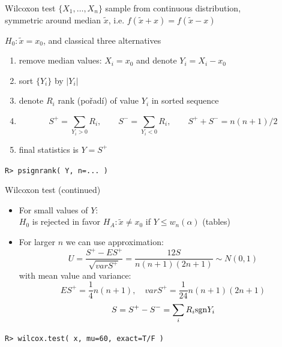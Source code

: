 \documentclass[smaller]{beamer}
\def\sgn{{\rm sgn}}
\def\abs#1{\lvert#1\rvert}
\def\blue#1{{\usebeamercolor[fg]{my blue} #1}}
\def\xskip{{\vspace{2ex}}}
\def\cz#1{{\small (#1)}}
\begin{document}
\begin{frame}[fragile]{Wilcoxon test}
$\{X_1,\dots,X_n\}$ sample from continuous distribution,\\
\blue{symmetric} around median $\tilde{x}$, i.e. $f(\tilde{x} + x) = f(\tilde{x} -x)$

\xskip
$H_0: \tilde{x} = x_0$, and classical three alternatives

\xskip
\begin{enumerate}
 \item remove median values: $X_i = x_0$ and denote $Y_i = X_i - x_0$
 \item sort $\{Y_i\}$ by $\abs{Y_i}$
 \item denote $R_i$ rank \cz{pořadí} of value $Y_i$ in sorted sequence
 \item \[
          S^+ = \sum_{Y_i >0} R_i,\qquad  S^- = \sum_{Y_i <0} R_i,\qquad S^+ + S^- = n(n+1)/2
       \]
 \item final statistics is $Y = S^+$
 
\end{enumerate}

\verb'R> psignrank( Y, n=... )'
\end{frame}


\begin{frame}[fragile]{Wilcoxon test (continued)}
 \begin{itemize}
  \item For small values of $Y$:\\
   $H_0$ is rejected in favor $H_A: \tilde{x} \ne x_0$ if $Y \le w_n(\alpha)$ (tables)
  \item For larger $n$ we can use approximation:
  \[
    U = \frac{S^+ - ES^+}{\sqrt{var S^+}} = \frac{12 S}{n(n+1)(2n+1)} \sim N(0,1)
  \]
with mean value and variance:
  \[
    ES^+ = \frac{1}{4}n(n+1),\quad var S^+ = \frac{1}{24}n(n+1)(2n+1)
  \]
  \[
    S = S^+ - S^- = \sum_{i} R_i \sgn Y_i
  \]
 \end{itemize}
 \verb'R> wilcox.test( x, mu=60, exact=T/F )'
\end{frame}
\end{document}

